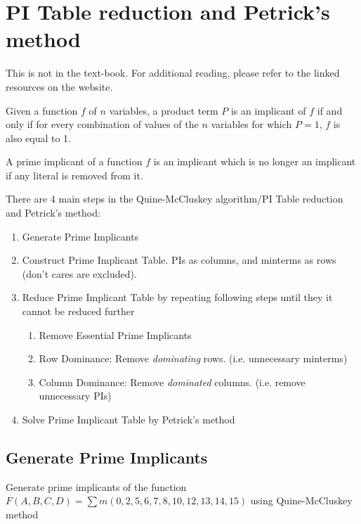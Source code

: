 \section{PI Table reduction and Petrick's method}
This is not in the text-book. For additional reading, please refer to the linked
resources on the website.


\begin{definition}[Implicant]
  Given a function $f$ of $n$ variables, a product term $P$ is an implicant of $f$
  if and only if for every combination of values of the $n$ variables for which $P=1$, $f$ is
  also equal to 1.
\end{definition}

\begin{definition}
  A prime implicant of a function $f$ is an implicant which is no longer an
  implicant if any literal is removed from it.
\end{definition}

There are 4 main steps in the Quine-McCluskey algorithm/PI Table reduction and Petrick's method:

\begin{enumerate}
\item Generate Prime Implicants
\item Construct Prime Implicant Table. PIs as columns, and minterms as
  rows (don't cares are excluded).
\item Reduce Prime Implicant Table by repeating following steps until they
  it cannot be reduced further
\begin{enumerate}
  \item Remove Essential Prime Implicants
  \item Row Dominance: Remove \emph{dominating} rows. (i.e. unnecessary minterms)
  \item Column Dominance: Remove \emph{dominated} columns. (i.e. remove unnecessary PIs)
\end{enumerate}
\item Solve Prime Implicant Table by Petrick's method
\end{enumerate}


\subsection{Generate Prime Implicants}

\begin{example}
  Generate prime implicants of the function $F (A, B, C, D) = \sum m(0, 2, 5, 6, 7,
  8, 10, 12, 13, 14, 15)$  using Quine-McCluskey method
\end{example}
\vspace{20em}

